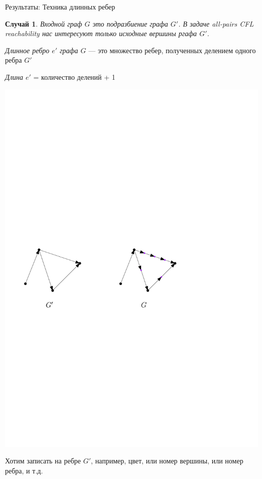 \documentclass{beamer}
\newtheorem{case}{Случай}
\begin{document}
\begin{frame}{Результаты: Техника длинных ребер}
	\begin{case}
		Входной граф $G$ это подразбиение графа $G'$. В задаче all-pairs CFL reachability нас интересуют только исходные вершины ргафа $G'$.
	\end{case}

	\textit{Длинное ребро $e'$ графа $G$} --- это множество ребер, полученных делением одного ребра $G'$
	
	\textit{Длина $e'$} = количество делений + 1
	
	\begin{center}
		\includegraphics[scale=0.6]{./pictures/long_edges_example.pdf}
	\end{center}

	Хотим записать на ребре $G'$, например, цвет, или номер вершины, или номер ребра, и т.д.

\end{frame}
\end{document}
